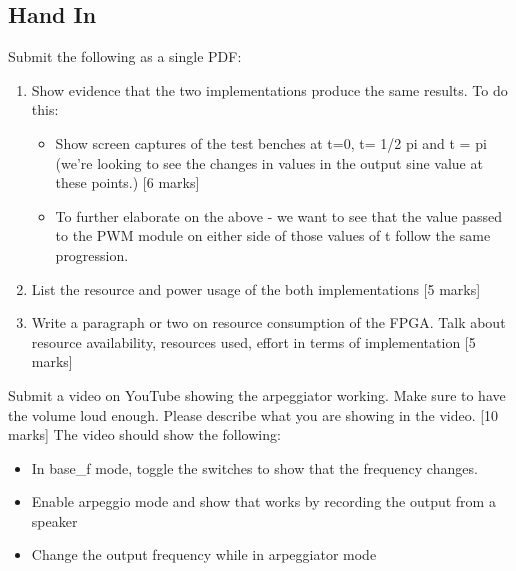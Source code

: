 \subsection{Hand In}
Submit the following as a single PDF:
\begin{enumerate}
    \item Show evidence that the two implementations produce the same results. To do this:
    \begin{itemize}
        \item Show screen captures of the test benches at t=0, t= 1/2 pi and t = pi (we're looking to see the changes in values in the output sine value at these points.) [6 marks]
        \item To further elaborate on the above - we want to see that the value passed to the PWM module on either side of those values of t follow the same progression.
    \end{itemize}
    \item List the resource and power usage of the both implementations [5 marks]
    \item Write a paragraph or two on resource consumption of the FPGA. Talk about resource availability, resources used, effort in terms of implementation  [5 marks]
\end{enumerate}

Submit a video on YouTube showing the arpeggiator working. Make sure to have the volume loud enough. Please describe what you are showing in the video. [10 marks] 
The video should show the following:
\begin{itemize}
    \item In base\_f mode, toggle the switches to show that the frequency changes.
    \item Enable arpeggio mode and show that works by recording the output from a speaker
    \item Change the output frequency while in arpeggiator mode
\end{itemize}
